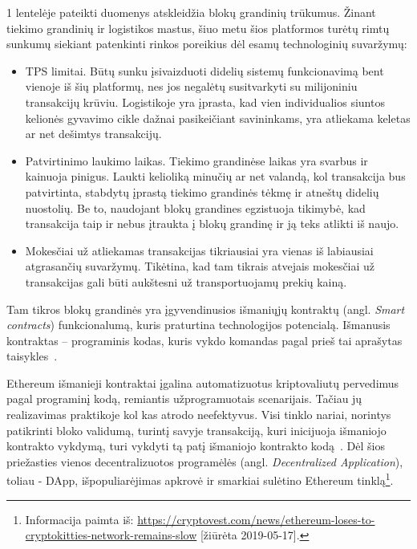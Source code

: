 
 \label{subsection:blockchain-drawbacks}

1 lentelėje pateikti duomenys atskleidžia blokų grandinių trūkumus. Žinant tiekimo grandinių ir logistikos mastus, šiuo metu šios platformos turėtų rimtų sunkumų siekiant patenkinti rinkos poreikius dėl esamų technologinių suvaržymų: 
\begin{itemize}
    \item TPS limitai. Būtų sunku įsivaizduoti didelių sistemų funkcionavimą bent vienoje iš šių platformų, nes jos negalėtų susitvarkyti su milijoniniu transakcijų krūviu. Logistikoje yra įprasta, kad vien individualios siuntos kelionės gyvavimo cikle dažnai pasikeičiant savininkams, yra atliekama keletas ar net dešimtys transakcijų.
    \item Patvirtinimo laukimo laikas. Tiekimo grandinėse laikas yra svarbus ir kainuoja pinigus. Laukti kelioliką minučių ar net valandą, kol transakcija bus patvirtinta, stabdytų įprastą tiekimo grandinės tėkmę ir atneštų didelių nuostolių. Be to, naudojant blokų grandines egzistuoja tikimybė, kad transakcija taip ir nebus įtraukta į blokų grandinę ir ją teks atlikti iš naujo.
    \item Mokesčiai už atliekamas transakcijas tikriausiai yra vienas iš labiausiai atgrasančių suvaržymų. Tikėtina, kad tam tikrais atvejais mokesčiai už transakcijas gali būti aukštesni už transportuojamų prekių kainą.
\end{itemize} 

Tam tikros blokų grandinės yra įgyvendinusios išmaniųjų kontraktų (angl. \textit{Smart contracts}) funkcionalumą, kuris praturtina technologijos potencialą. Išmanusis kontraktas – programinis kodas, kuris vykdo komandas pagal prieš tai aprašytas taisykles~\cite{buterin2013ethereum}.

Ethereum išmanieji kontraktai įgalina automatizuotus kriptovaliutų pervedimus pagal programinį kodą, remiantis užprogramuotais scenarijais. Tačiau jų realizavimas praktikoje kol kas atrodo neefektyvus. Visi tinklo nariai, norintys patikrinti bloko validumą, turintį savyje transakciją, kuri inicijuoja išmaniojo kontrakto vykdymą, turi vykdyti tą patį išmaniojo kontrakto kodą~\cite{buterin2013ethereum}. Dėl šios priežasties vienos decentralizuotos programėlės (angl. \textit{Decentralized Application}), toliau - DApp, išpopuliarėjimas apkrovė ir smarkiai sulėtino Ethereum tinklą\footnote{Informacija paimta iš: \href{https://cryptovest.com/news/ethereum-loses-to-cryptokitties-network-remains-slow}{https://cryptovest.com/news/ethereum-loses-to-cryptokitties-network-remains-slow} [žiūrėta 2019-05-17].}.\pagebreak



